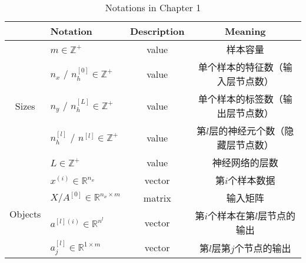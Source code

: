 \begin{table}[htb!]
    \centering
    \begin{threeparttable}
    \caption{Notations in Chapter 1}
    \begin{tabular}{clcc}
        \toprule
                                    & \textbf{Notation}                                     & \textbf{Description} & \textbf{Meaning}                                                   \\ 
        \midrule
        \multirow{5}{*}{Sizes}      & $m \in \mathbb{Z}^+$                                  & value                & 样本容量                                                               \\
                                    & $n_x$ / $n_h^{[0]} \in \mathbb{Z}^+$                  & value                & 单个样本的特征数（输入层节点数）                                         \\
                                    & $n_y$ / $n_h^{[L]} \in \mathbb{Z}^+$                  & value                & 单个样本的标签数（输出层节点数）                                      \\
                                    & $n_h^{[l]}$ / $n^{[l]} \in \mathbb{Z}^+$              & value                & 第$l$层的神经元个数（隐藏层节点数）                                   \\
                                    & $L \in \mathbb{Z}^+$                                  & value                & 神经网络的层数                                                         \\ 
        \midrule
        \multirow{11}{*}{Objects}   & $x^{(i)} \in \mathbb{R}^{n_x}$                        & vector               & 第$i$个样本数据                                                          \\
                                    & $X / A^{[0]} \in {\mathbb{R}^{n_x \times m}}$         & matrix               & 输入矩阵                                                               \\
                                    & $a^{[l](i)} \in \mathbb{R}^{n^{l}}$                   & vector               & 第$i$个样本在第$l$层节点的输出                                                  \\
                                    & $a_j^{[l]} \in \mathbb{R}^{1 \times {m}}$             & vector               & 第$l$层第$j$个节点的输出                                                         \\

\end{tabular}
\end{threeparttable}
\end{table}
